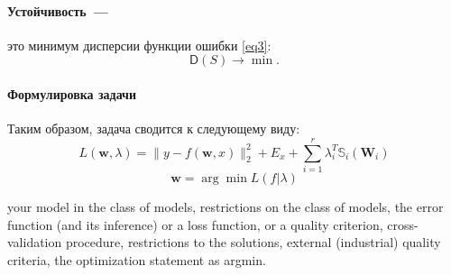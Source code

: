 \documentclass[12pt, twoside]{article}
\newcommand{\wm}{{\mathbf{w}}}
\begin{document}
\paragraph{Устойчивость~---}это минимум дисперсии функции ошибки \eqref{eq3}:
\begin{equation}\label{eq103}
\mathsf{D}(S) \rightarrow \min.
\end{equation}
\paragraph{Формулировка задачи}
Таким образом, задача сводится к следующему виду:
\begin{equation}\label{eq:criterion_function}
L(\wm,\mathbb{\lambda}) = \|y - f(\mathbf{w}, x)\|_2^2 + E_x +
\sum\limits_{i = 1}^r\mathbb{\lambda}_i^T\mathbb{S}_i(\mathbf{W}_i)
\end{equation}
\begin{equation}\label{eq:criterion_argmin}
\wm= \arg \min L(f| \mathbb{\lambda})
\end{equation}

your model in the class of models,
restrictions on the class of models,
the error function (and its inference) or a loss function, or a quality criterion,
cross-validation procedure,
restrictions to the solutions,
external (industrial) quality criteria,
the optimization statement as argmin.
\end{document}
